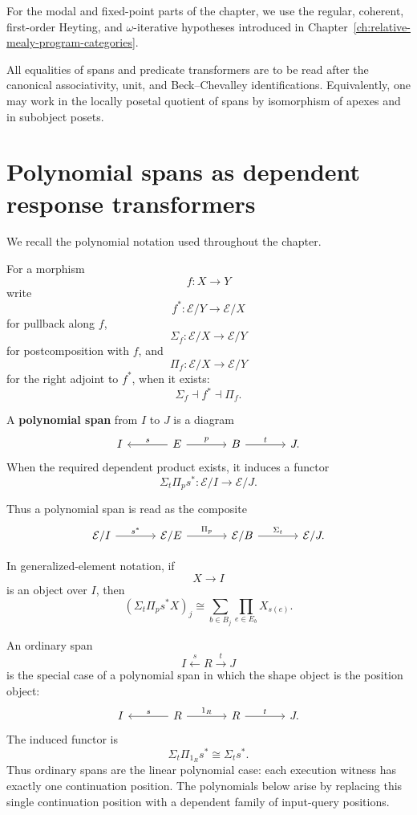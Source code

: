For the modal and fixed-point parts of the chapter, we use the regular,
coherent, first-order Heyting, and \(\omega\)-iterative hypotheses introduced
in Chapter~\ref{ch:relative-mealy-program-categories}.

All equalities of spans and predicate transformers are to be read after the
canonical associativity, unit, and Beck--Chevalley identifications.
Equivalently, one may work in the locally posetal quotient of spans by
isomorphism of apexes and in subobject posets.

\section{Polynomial spans as dependent response transformers}
\label{sec:poly-relative-polynomial-spans}

We recall the polynomial notation used throughout the chapter.

For a morphism
\[
f:X\to Y
\]
write
\[
f^\ast:\mathcal E/Y\to\mathcal E/X
\]
for pullback along \(f\),
\[
\Sigma_f:\mathcal E/X\to\mathcal E/Y
\]
for postcomposition with \(f\), and
\[
\Pi_f:\mathcal E/X\to\mathcal E/Y
\]
for the right adjoint to \(f^\ast\), when it exists:
\[
\Sigma_f\dashv f^\ast\dashv \Pi_f.
\]

\begin{definition}
\label{def:poly-relative-polynomial-span}
A \textbf{polynomial span} from \(I\) to \(J\) is a diagram
\[
\begin{tikzcd}[column sep=large]
I
&
E
  \arrow[l, "s"']
  \arrow[r, "p"]
&
B
  \arrow[r, "t"]
&
J .
\end{tikzcd}
\]
When the required dependent product exists, it induces a functor
\[
\Sigma_t\Pi_p s^\ast:
\mathcal E/I\to\mathcal E/J.
\]
\end{definition}

Thus a polynomial span is read as the composite
\[
\begin{tikzcd}[column sep=large]
\mathcal E/I
  \arrow[r, "s^\ast"]
&
\mathcal E/E
  \arrow[r, "\Pi_p"]
&
\mathcal E/B
  \arrow[r, "\Sigma_t"]
&
\mathcal E/J .
\end{tikzcd}
\]

In generalized-element notation, if
\[
X\to I
\]
is an object over \(I\), then
\[
\left(\Sigma_t\Pi_p s^\ast X\right)_j
\cong
\sum_{b\in B_j}
\prod_{e\in E_b}
X_{s(e)}.
\]

\begin{remark}
\label{rem:poly-relative-linear-spans}
An ordinary span
\[
I\xleftarrow{s}R\xrightarrow{t}J
\]
is the special case of a polynomial span in which the shape object is the
position object:
\[
\begin{tikzcd}[column sep=large]
I
&
R
  \arrow[l, "s"']
  \arrow[r, "1_R"]
&
R
  \arrow[r, "t"]
&
J .
\end{tikzcd}
\]
The induced functor is
\[
\Sigma_t\Pi_{1_R}s^\ast
\cong
\Sigma_t s^\ast.
\]
Thus ordinary spans are the linear polynomial case: each execution witness has
exactly one continuation position.  The polynomials below arise by replacing
this single continuation position with a dependent family of input-query
positions.
\end{remark}

